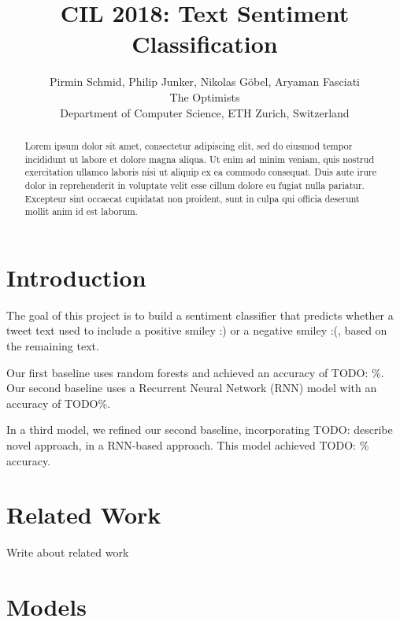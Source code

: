 \documentclass[10pt,conference,compsocconf]{IEEEtran}
\newcommand{\todo}[1]{}
\renewcommand{\todo}[1]{{\color{red} TODO: {#1}}}
\begin{document}
\title{CIL 2018: Text Sentiment Classification}

\author{
  Pirmin Schmid, Philip Junker, Nikolas Göbel, Aryaman Fasciati\\
  The Optimists\\
  Department of Computer Science, ETH Zurich, Switzerland
}

\maketitle

\begin{abstract}
  Lorem ipsum dolor sit amet, consectetur adipiscing elit, sed do
  eiusmod tempor incididunt ut labore et dolore magna aliqua. Ut enim ad
  minim veniam, quis nostrud exercitation ullamco laboris nisi ut
  aliquip ex ea commodo consequat. Duis aute irure dolor in
  reprehenderit in voluptate velit esse cillum dolore eu fugiat nulla
  pariatur. Excepteur sint occaecat cupidatat non proident, sunt in
  culpa qui officia deserunt mollit anim id est laborum.
\end{abstract}


\section{Introduction}

The goal of this project is to build a sentiment classifier
that predicts whether a tweet text used to include a
positive smiley :) or a negative smiley :(,
based on the remaining text.

Our first baseline uses random forests and achieved an accuracy of \todo{\%}.
Our second baseline uses a Recurrent Neural Network (RNN) model with
an accuracy of TODO\%.

In a third model, we refined our second baseline, incorporating
\todo{describe novel approach}, in a RNN-based approach.
This model achieved \todo{\%} accuracy.



\section{Related Work}
Write about related work \cite{go2016mastering}



\section{Models}
\end{document}
